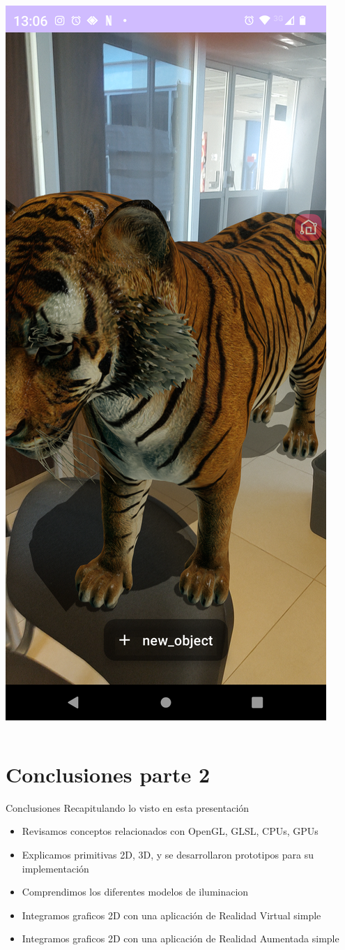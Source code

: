 \documentclass[aspectratio=169,compress]{beamer}
\begin{document}
\begin{frame}[fragile]
\begin{columns}
\begin{column}{0.48\textwidth}
\includegraphics[width=0.45\linewidth]{PantallazosDemoTaller/Demo16-2.png}
\end{column}
\end{columns}
\end{frame}





\section[Conclusiones]{Conclusiones parte 2}
\begin{frame}{Conclusiones}
Recapitulando lo visto en esta presentación
\begin{itemize}
\item Revisamos conceptos relacionados con OpenGL, GLSL, CPUs, GPUs
\item Explicamos primitivas 2D, 3D, y se desarrollaron prototipos para su implementación
\item Comprendimos los diferentes modelos de iluminacion
\item Integramos graficos 2D con una aplicación de Realidad Virtual simple
\item Integramos graficos 2D con una aplicación de Realidad Aumentada simple
\end{itemize}
\end{frame}
\end{document}
